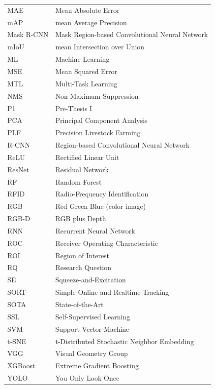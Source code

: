 \begin{longtable}{ll}
MAE & Mean Absolute Error \\
mAP & mean Average Precision \\
Mask R-CNN & Mask Region-based Convolutional Neural Network \\
mIoU & mean Intersection over Union \\
ML & Machine Learning \\
MSE & Mean Squared Error \\
MTL & Multi-Task Learning \\
NMS & Non-Maximum Suppression \\
P1 & Pre-Thesis I \\
PCA & Principal Component Analysis \\
PLF & Precision Livestock Farming \\
R-CNN & Region-based Convolutional Neural Network \\
ReLU & Rectified Linear Unit \\
ResNet & Residual Network \\
RF & Random Forest \\
RFID & Radio-Frequency Identification \\
RGB & Red Green Blue (color image) \\
RGB-D & RGB plus Depth \\
RNN & Recurrent Neural Network \\
ROC & Receiver Operating Characteristic \\
ROI & Region of Interest \\
RQ & Research Question \\
SE & Squeeze-and-Excitation \\
SORT & Simple Online and Realtime Tracking \\
SOTA & State-of-the-Art \\
SSL & Self-Supervised Learning \\
SVM & Support Vector Machine \\
t-SNE & t-Distributed Stochastic Neighbor Embedding \\
VGG & Visual Geometry Group \\
XGBoost & Extreme Gradient Boosting \\
YOLO & You Only Look Once \\
\end{longtable}


\pagebreak